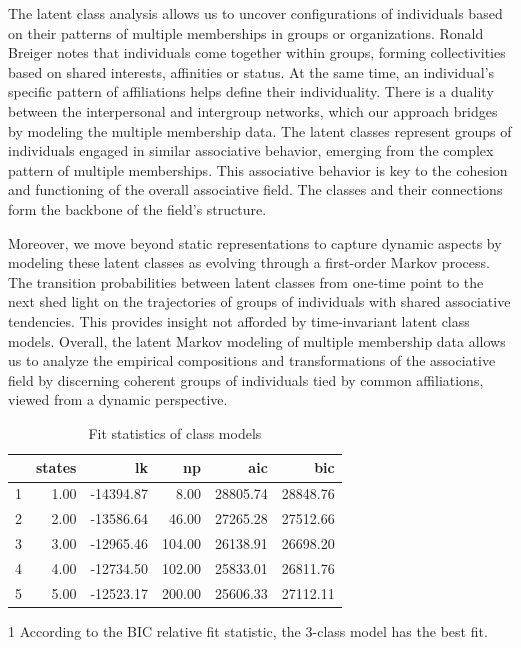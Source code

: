 The latent class analysis allows us to uncover configurations of individuals based on their patterns of multiple memberships in groups or organizations. Ronald Breiger \parencite*{breiger_duality_1974} notes that individuals come together within groups, forming collectivities based on shared interests, affinities or status. At the same time, an individual's specific pattern of affiliations helps define their individuality. There is a duality between the interpersonal and intergroup networks, which our approach bridges by modeling the multiple membership data. The latent classes represent groups of individuals engaged in similar associative behavior, emerging from the complex pattern of multiple memberships. This associative behavior is key to the cohesion and functioning of the overall associative field. The classes and their connections form the backbone of the field's structure.
\bigskip

Moreover, we move beyond static representations to capture dynamic aspects by modeling these latent classes as evolving through a first-order Markov process. The transition probabilities between latent classes from one-time point to the next shed light on the trajectories of groups of individuals with shared associative tendencies. This provides insight not afforded by time-invariant latent class models. Overall, the latent Markov modeling of multiple membership data allows us to analyze the empirical compositions and transformations of the associative field by discerning coherent groups of individuals tied by common affiliations, viewed from a dynamic perspective. 


\begin{table}[H]
\centering
\begin{threeparttable}
\caption{\label{demo-table} Fit statistics of class models}
\begin{tabular}{rrrrrr}
  \hline
 & states & lk & np & aic & bic \\ 
  \hline
1 & 1.00 & -14394.87 & 8.00 & 28805.74 & 28848.76 \\ 
  2 & 2.00 & -13586.64 & 46.00 & 27265.28 & 27512.66 \\ 
  3 & 3.00 & -12965.46 & 104.00 & 26138.91 & 26698.20 \\ 
  4 & 4.00 & -12734.50 & 102.00 & 25833.01 & 26811.76 \\ 
  5 & 5.00 & -12523.17 & 200.00 & 25606.33 & 27112.11 \\ 
   \hline
\end{tabular}
\begin{tablenotes}
    \item[1] According to the BIC relative fit statistic, the 3-class model has the best fit.
  \end{tablenotes}
\end{threeparttable}
\end{table}

